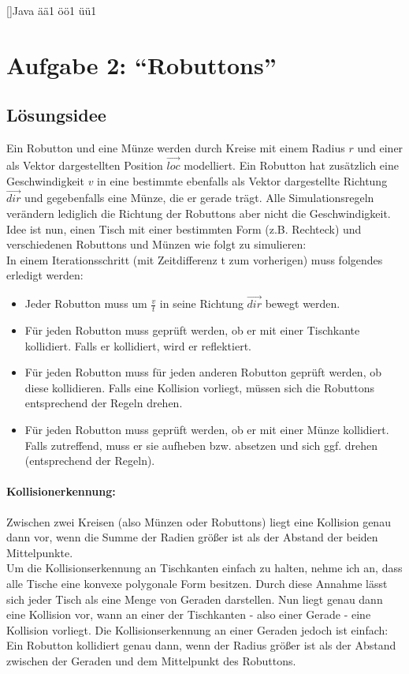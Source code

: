 []{Java}
   {{ä}{{\"a}}1 {ö}{{\"o}}1 {ü}{{\"u}}1}

\section{Aufgabe 2: ``Robuttons''}
\subsection{Lösungsidee}
Ein Robutton und eine Münze werden durch Kreise mit einem Radius $r$ und einer als Vektor dargestellten Position $\vec{loc}$ modelliert.
Ein Robutton hat zusätzlich eine Geschwindigkeit $v$ in eine bestimmte ebenfalls als Vektor dargestellte Richtung $\vec{dir}$
und gegebenfalls eine Münze, die er gerade trägt.
Alle Simulationsregeln verändern lediglich die Richtung der Robuttons aber nicht die Geschwindigkeit.
Idee ist nun, einen Tisch mit einer bestimmten Form (z.B. Rechteck) und verschiedenen Robuttons und Münzen wie folgt zu simulieren: \\
In einem Iterationsschritt (mit Zeitdifferenz t zum vorherigen) muss folgendes erledigt werden: \\
\begin{itemize}
 \item Jeder Robutton muss um $\frac{v}{t}$ in seine Richtung $\vec{dir}$ bewegt werden.
 \item Für jeden Robutton muss geprüft werden, ob er mit einer Tischkante kollidiert. Falls er kollidiert, wird er reflektiert.
 \item Für jeden Robutton muss für jeden anderen Robutton geprüft werden, ob diese kollidieren.
       Falls eine Kollision vorliegt, müssen sich die Robuttons entsprechend der Regeln drehen.
 \item Für jeden Robutton muss geprüft werden, ob er mit einer Münze kollidiert.
       Falls zutreffend, muss er sie aufheben bzw. absetzen und sich ggf. drehen (entsprechend der Regeln).
\end{itemize}
\paragraph{Kollisionerkennung:}
Zwischen zwei Kreisen (also Münzen oder Robuttons) liegt eine Kollision genau dann vor,
wenn die Summe der Radien größer ist als der Abstand der beiden Mittelpunkte. \\
Um die Kollisionserkennung an Tischkanten einfach zu halten, nehme ich an, dass alle Tische eine konvexe polygonale Form besitzen.
Durch diese Annahme lässt sich jeder Tisch als eine Menge von Geraden darstellen. Nun liegt genau dann eine Kollision vor,
wann an einer der Tischkanten - also einer Gerade - eine Kollision vorliegt.
Die Kollisionserkennung an einer Geraden jedoch ist einfach: Ein Robutton kollidiert genau dann,
wenn der Radius größer ist als der Abstand zwischen der Geraden und dem Mittelpunkt des Robuttons.
